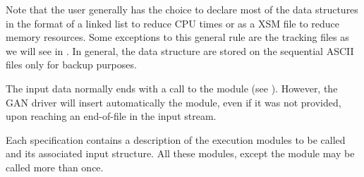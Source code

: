 Note that the user generally has the choice to declare most of the data
structures in the format of a linked list to reduce CPU times or as a XSM
file to reduce memory resources. Some exceptions to this general rule are
the tracking files as we will see in . In general, the data
structure are stored on the sequential ASCII files only for backup purposes.

\vskip 0.2cm

The input data normally ends with a call to
the  module (see ). However, the GAN driver will insert
automatically the
 module, even if it was not provided, upon reaching an end-of-file in
the input stream.

\vskip 0.2cm

Each  specification contains a description of the execution modules to
be called and its associated input structure. All these
modules, except the  module may be called more than once.


